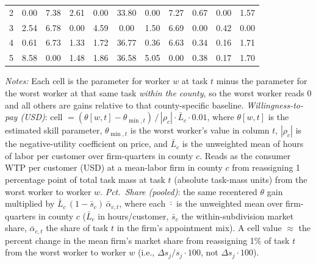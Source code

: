 \begin{threeparttable}
\begin{tabular}[t]{ccccccccccc}
\hspace{1em}2 & 0.00 & 7.38 & 2.61 & 0.00 & 33.80 & 0.00 & 7.27 & 0.67 & 0.00 & 1.57\\
\hspace{1em}3 & 2.54 & 6.78 & 0.00 & 4.59 & 0.00 & 1.50 & 6.69 & 0.00 & 0.42 & 0.00\\
\hspace{1em}4 & 0.61 & 6.73 & 1.33 & 1.72 & 36.77 & 0.36 & 6.63 & 0.34 & 0.16 & 1.71\\
\hspace{1em}5 & 8.58 & 0.00 & 1.48 & 1.86 & 36.58 & 5.05 & 0.00 & 0.38 & 0.17 & 1.70\\
\bottomrule
\end{tabular}
\begin{tablenotes}
\footnotesize
\item[] \textit{Notes:} Each cell is the parameter for worker $w$ at task $t$ minus the parameter for the worst worker at that same task \emph{within the county}, so the worst worker reads 0 and all others are gains relative to that county-specific baseline. \textit{Willingness-to-pay (USD)}: cell $= (\theta[w,t] - \theta_{\min,t})\,/\,|\rho_c| \cdot \bar L_c \cdot 0.01$, where $\theta[w,t]$ is the estimated skill parameter, $\theta_{\min,t}$ is the worst worker's value in column $t$, $|\rho_c|$ is the negative-utility coefficient on price, and $\bar L_c$ is the unweighted mean of hours of labor per customer over firm-quarters in county $c$. Reads as the consumer WTP per customer (USD) at a mean-labor firm in county $c$ from reassigning 1 percentage point of total task mass at task $t$ (absolute task-mass units) from the worst worker to worker $w$. \textit{Pct.\ Share (pooled)}: the same recentered $\theta$ gain multiplied by $\bar L_c\,(1-\bar s_c)\,\bar\alpha_{c,t}$, where each $\bar{\cdot}$ is the unweighted mean over firm-quarters in county $c$ ($\bar L_c$ in hours/customer, $\bar s_c$ the within-subdivision market share, $\bar\alpha_{c,t}$ the share of task $t$ in the firm's appointment mix). A cell value $\approx$ the percent change in the mean firm's market share from reassigning 1\% of task $t$ from the worst worker to worker $w$ (i.e., $\Delta s_j / s_j \cdot 100$, not $\Delta s_j \cdot 100$).
\end{tablenotes}
\end{threeparttable}
